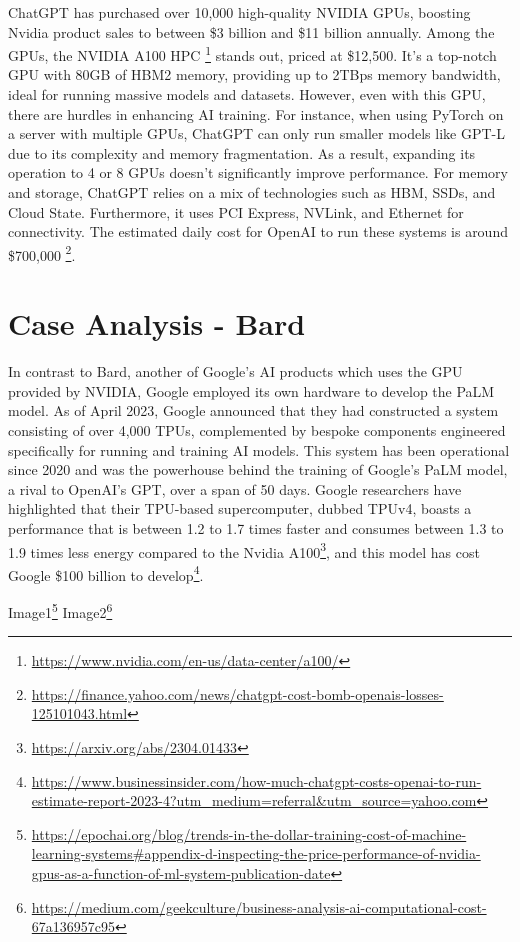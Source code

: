 \documentclass[
]{book}
\begin{document}
ChatGPT has purchased over 10,000 high-quality NVIDIA GPUs, boosting Nvidia product sales to between \$3 billion and \$11 billion annually. Among the GPUs, the NVIDIA A100 HPC \footnote{\url{https://www.nvidia.com/en-us/data-center/a100/}} stands out, priced at \$12,500. It's a top-notch GPU with 80GB of HBM2 memory, providing up to 2TBps memory bandwidth, ideal for running massive models and datasets. However, even with this GPU, there are hurdles in enhancing AI training. For instance, when using PyTorch on a server with multiple GPUs, ChatGPT can only run smaller models like GPT-L due to its complexity and memory fragmentation. As a result, expanding its operation to 4 or 8 GPUs doesn't significantly improve performance. For memory and storage, ChatGPT relies on a mix of technologies such as HBM, SSDs, and Cloud State. Furthermore, it uses PCI Express, NVLink, and Ethernet for connectivity. The estimated daily cost for OpenAI to run these systems is around \$700,000 \footnote{\url{https://finance.yahoo.com/news/chatgpt-cost-bomb-openais-losses-125101043.html}}.

\hypertarget{case-analysis---bard}{%
\section{Case Analysis - Bard}\label{case-analysis---bard}}

In contrast to Bard, another of Google's AI products which uses the GPU provided by NVIDIA, Google employed its own hardware to develop the PaLM model. As of April 2023, Google announced that they had constructed a system consisting of over 4,000 TPUs, complemented by bespoke components engineered specifically for running and training AI models. This system has been operational since 2020 and was the powerhouse behind the training of Google's PaLM model, a rival to OpenAI's GPT, over a span of 50 days. Google researchers have highlighted that their TPU-based supercomputer, dubbed TPUv4, boasts a performance that is between 1.2 to 1.7 times faster and consumes between 1.3 to 1.9 times less energy compared to the Nvidia A100\footnote{\url{https://arxiv.org/abs/2304.01433}}, and this model has cost Google \$100 billion to develop\footnote{\url{https://www.businessinsider.com/how-much-chatgpt-costs-openai-to-run-estimate-report-2023-4?utm_medium=referral\&utm_source=yahoo.com}}.

Image1\footnote{\url{https://epochai.org/blog/trends-in-the-dollar-training-cost-of-machine-learning-systems\#appendix-d-inspecting-the-price-performance-of-nvidia-gpus-as-a-function-of-ml-system-publication-date}}
Image2\footnote{\url{https://medium.com/geekculture/business-analysis-ai-computational-cost-67a136957c95}}
\end{document}
